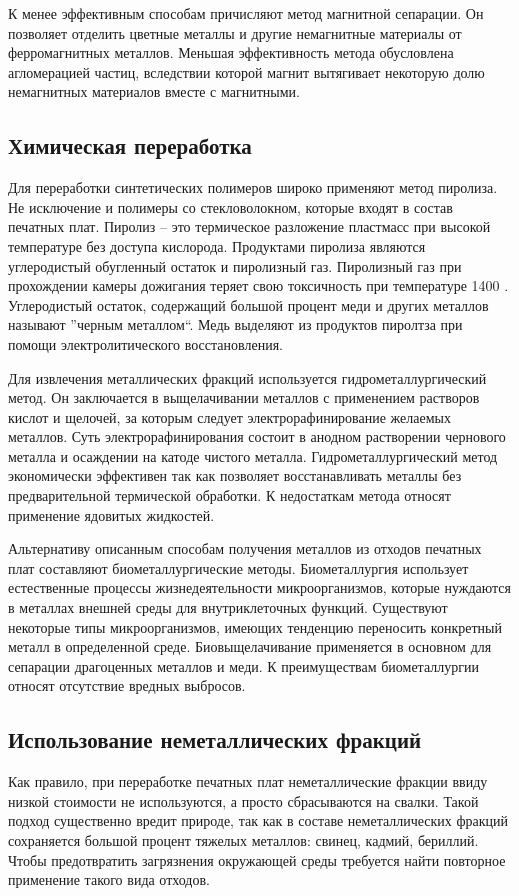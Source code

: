 \documentclass[14pt,oneside,final]{extreport}
\begin{document}
	К менее эффективным способам причисляют метод магнитной сепарации. Он позволяет отделить цветные металлы и другие немагнитные материалы от ферромагнитных металлов. Меньшая эффективность метода обусловлена агломерацией частиц, вследствии которой магнит вытягивает некоторую долю немагнитных материалов вместе с магнитными.   
	
	\subsection{Химическая переработка}
	Для переработки синтетических полимеров широко применяют метод пиролиза. Не исключение и полимеры со стекловолокном, которые входят в состав печатных плат. Пиролиз -- это термическое разложение пластмасс при высокой температуре без доступа кислорода. Продуктами пиролиза являются углеродистый обугленный остаток и пиролизный газ. Пиролизный газ при прохождении камеры дожигания теряет свою токсичность при температуре 1400  \textcelsius. Углеродистый остаток, содержащий  большой процент меди и других металлов называют ''черным металлом``. Медь выделяют из продуктов пиролтза при помощи электролитического восстановления.
	
	Для извлечения металлических фракций используется гидрометаллургический метод. Он заключается в выщелачивании металлов с применением растворов кислот и щелочей, за которым следует электрорафинирование желаемых металлов. Суть электрорафинирования состоит в анодном растворении чернового металла и осаждении на катоде чистого металла. Гидрометаллургический метод экономически эффективен так как позволяет восстанавливать металлы без предварительной термической обработки. К недостаткам метода относят применение ядовитых жидкостей. 
	
	Альтернативу описанным способам получения металлов из отходов печатных плат составляют биометаллургические методы. Биометаллургия использует естественные процессы жизнедеятельности микроорганизмов, которые нуждаются в металлах внешней среды для внутриклеточных функций. Существуют некоторые типы микроорганизмов, имеющих тенденцию переносить конкретный металл в определенной среде. Биовыщелачивание применяется в основном для сепарации драгоценных металлов и меди. К преимуществам биометаллургии относят отсутствие вредных выбросов. 
	
	\subsection{Использование неметаллических фракций}
	Как правило, при переработке печатных плат неметаллические фракции ввиду низкой стоимости не используются, а просто сбрасываются на свалки. Такой подход существенно вредит природе, так как в составе неметаллических фракций сохраняется большой процент тяжелых металлов: свинец, кадмий, бериллий. Чтобы предотвратить загрязнения окружающей среды требуется найти повторное применение такого вида отходов. 
	
\end{document}
